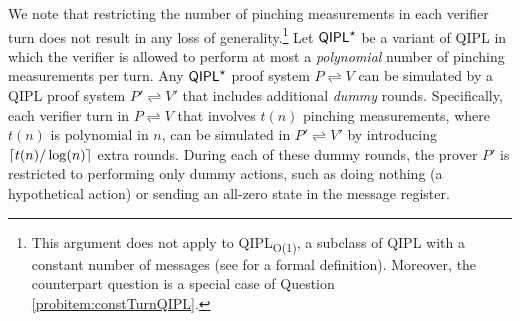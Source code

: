 \documentclass[10pt,a4paper]{article}
\numberwithin{equation}{section}
\numberwithin{figure}{section}
\newcommand{\QIPL}{\textnormal{\textsf{QIPL}}\xspace}
\newcommand{\QIPLconst}{\texorpdfstring{\textnormal{\textsf{QIPL}\textsubscript{O(1)}}}\xspace}
\newcommand{\protocol}[2]{{#1}\!\rightleftharpoons\!{#2}}
\DeclarePairedDelimiter\ceil{\lceil}{\rceil}
\begin{document}
\begin{remark}
    \label{remark:restrict-measurement-times}
    We note that restricting the number of pinching measurements in each verifier turn does not result in any loss of generality.\footnote{This argument does not apply to \QIPLconst{}, a subclass of \QIPL{} with a constant number of messages (see  for a formal definition). Moreover, the counterpart question is a special case of Question \ref{probitem:constTurnQIPL}.} 
    Let $\QIPL^\star$ be a variant of \QIPL{} in which the verifier is allowed to perform at most a \textit{polynomial} number of pinching measurements per turn. Any $\QIPL^\star$ proof system $\protocol{P}{V}$ can be simulated by a \QIPL{} proof system $\protocol{P'}{V'}$ that includes additional \textit{dummy} rounds. Specifically, each verifier turn in $\protocol{P}{V}$ that involves $t(n)$ pinching measurements, where $t(n)$ is polynomial in $n$, can be simulated in $\protocol{P'}{V'}$ by introducing $\ceil{t(n)/\log(n)}$ extra rounds. During each of these dummy rounds, the prover $P'$ is restricted to performing only dummy actions, such as doing nothing (a hypothetical action) or sending an all-zero state in the message register. 
\end{remark}
\end{document}
